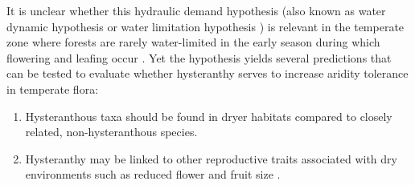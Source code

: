 \documentclass{article}[11pt]
\begin{document}
It is unclear whether this hydraulic demand hypothesis (also known as water dynamic hypothesis \citep{Gougherty2018} or water limitation hypothesis \citep{Buonaiuto2020}) is relevant in the temperate zone where forests are rarely water-limited in the early season during which flowering and leafing occur \citep{Polgar2011}.%
Yet the hypothesis yields several predictions that can be tested to evaluate whether hysteranthy serves to increase aridity tolerance in temperate flora:
\begin{enumerate}
\item Hysteranthous taxa should be found in dryer habitats compared to closely related, non-hysteranthous species.
\item Hysteranthy may be linked to other reproductive traits associated with dry environments such as reduced flower and fruit size \citep{Herrera:2009aa,Liu:2013ua}.
\end{enumerate}


\end{document}
